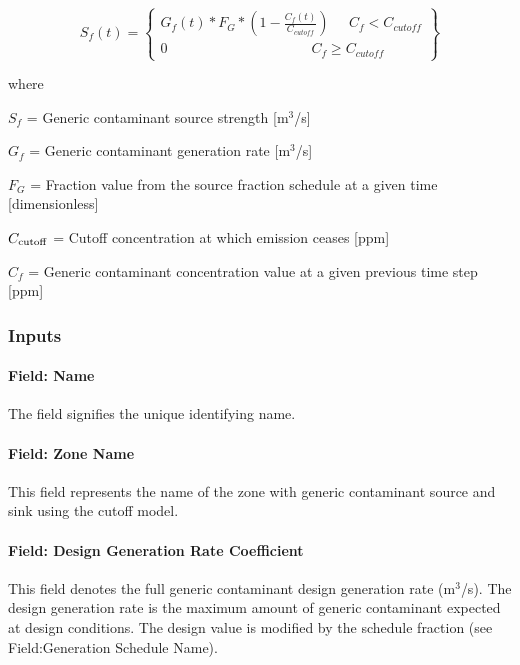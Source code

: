 \begin{equation}
{S_f}(t) = \left\{ \begin{array}{l}{G_f}(t)*{F_G}*\left( {1 - \frac{{{C_f}(t)}}{{{C_{cutoff}}}}} \right)\;\;\;\;\;{C_f} < {C_{cutoff}}\\0\;\;\;\;\;\;\;\;\;\;\;\;\;\;\;\;\;\;\;\;\;\;\;\;\;\;\;\;\;\;\;\;\;\;\;\;\;{C_f} \ge {C_{cutoff}}\end{array} \right\}
\end{equation}

where

\(S_{f}\) = Generic contaminant source strength {[}m\(^{3}\)/s{]}

\(G_{f}\) = Generic contaminant generation rate {[}m\(^{3}\)/s{]}

\(F_{G}\) = Fraction value from the source fraction schedule at a given time {[}dimensionless{]}

\(C_{\rm{cutoff}}\) = Cutoff concentration at which emission ceases {[}ppm{]}

\(C_{f}\) = Generic contaminant concentration value at a given previous time step {[}ppm{]}

\subsubsection{Inputs}\label{inputs-13-006}

\paragraph{Field: Name}\label{field-name-13-005}

The field signifies the unique identifying name.

\paragraph{Field: Zone Name}\label{field-zone-name-4-002}

This field represents the name of the zone with generic contaminant source and sink using the cutoff model.

\paragraph{Field: Design Generation Rate Coefficient}\label{field-design-generation-rate-coefficient-1}

This field denotes the full generic contaminant design generation rate (m\(^{3}\)/s). The design generation rate is the maximum amount of generic contaminant expected at design conditions. The design value is modified by the schedule fraction (see Field:Generation Schedule Name).

